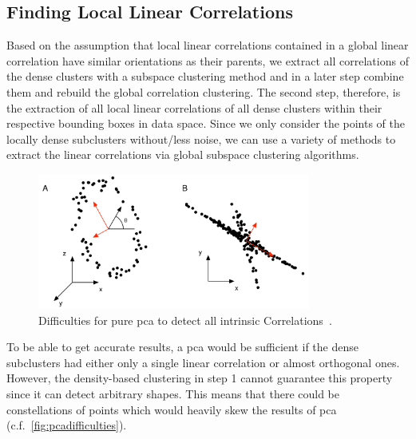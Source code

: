 \subsection{Finding Local Linear Correlations}\label{ssec:findinglocals}
Based on the assumption that local linear correlations contained in a global linear correlation have similar orientations as their parents, we extract all correlations of the dense clusters with a subspace clustering method and in a later step combine them and rebuild the global correlation clustering. 
The second step, therefore, is the extraction of all local linear correlations of all dense clusters within their respective bounding boxes in data space. Since we only consider the points of the locally dense subclusters without/less noise, we can use a variety of methods to extract the linear correlations via global subspace clustering algorithms. 

\begin{figure}[h]
    \centering
    \includegraphics[width=0.8\textwidth]{figures/PCAdifficulties.png}
    \caption{Difficulties for pure \acrshort{pca} to detect all intrinsic Correlations~\cite{PCAshlens2014tutorial}.}
    \label{fig:pcadifficulties}
\end{figure}

To be able to get accurate results, a \gls{pca} would be sufficient if the dense subclusters had either only a single linear correlation or almost orthogonal ones. However, the density-based clustering in step 1 cannot guarantee this property since it can detect arbitrary shapes. This means that there could be constellations of points which would heavily skew the results of \gls{pca} (c.f.~\autoref{fig:pcadifficulties})\cite{PCAshlens2014tutorial}. 


